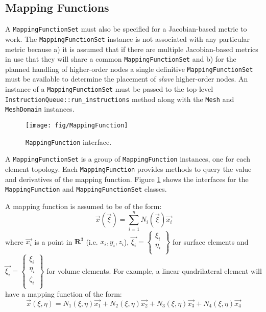 \documentclass{article}
\begin{document}
\subsection{Mapping Functions}

A \texttt{MappingFunctionSet} must also be specified for a Jacobian-based metric to work.  The \texttt{MappingFunctionSet} instance is not associated with any particular metric because a) it is assumed that if there are multiple Jacobian-based metrics in use that they will share a common \texttt{MappingFunctionSet} and b) for the planned handling of higher-order nodes a single definitive \texttt{MappingFunctionSet} must be available to determine the placement of \emph{slave} higher-order nodes.  An instance of a \texttt{MappingFunctionSet} must be passed to the top-level \texttt{InstructionQueue::run\_instructions} method along with the \texttt{Mesh} and \texttt{MeshDomain} instances.

\begin{figure}[htb]
\begin{center}
\texttt{[image: fig/MappingFunction]}
\caption{\texttt{MappingFunction} interface.\label{fig:MappingFunction}}
\end{center}
\end{figure}

A \texttt{MappingFunctionSet} is a group of \texttt{MappingFunction} instances, one for each element topology.  Each \texttt{MappingFunction} provides methods to query the value and derivatives of the mapping function.  Figure \ref{fig:MappingFunction} shows the interfaces for the \texttt{MappingFunction} and \texttt{MappingFunctionSet} classes.

A mapping function is assumed to be of the form:
\begin{displaymath}
\vec{x}(\vec{\xi})=\sum_{i=1}^n N_i(\vec{\xi})\vec{x_i}
\end{displaymath}
where $\vec{x_i}$ is a point in $\mathbf{R}^3$ (i.e. $x_i,y_i,z_i$), $\vec{\xi_i} = \left\{\begin{array}{c}\xi_i\\ \eta_i\\ \end{array}\right\}$ for surface elements and $\vec{\xi_i} = \left\{\begin{array}{c}\xi_i\\ \eta_i\\ \zeta_i\\ \end{array}\right\}$ for volume elements.  For example,  a linear quadrilateral element will have a mapping function of the form:
\begin{displaymath}
\vec{x}(\xi,\eta)=N_1(\xi,\eta)\vec{x_1}
                      +N_2(\xi,\eta)\vec{x_2}
                      +N_3(\xi,\eta)\vec{x_3}
                      +N_4(\xi,\eta)\vec{x_4}
\end{displaymath}
\end{document}
